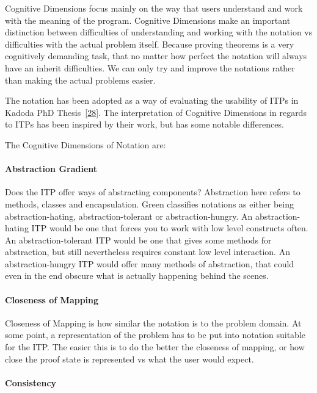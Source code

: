 \documentclass[
]{article}
\begin{document}
Cognitive Dimensions focus mainly on the way that users understand and
work with the meaning of the program. Cognitive Dimensions make an
important distinction between difficulties of understanding and working
with the notation vs difficulties with the actual problem itself.
Because proving theorems is a very cognitively demanding task, that no
matter how perfect the notation will always have an inherit
difficulties. We can only try and improve the notations rather than
making the actual problems easier.

The notation has been adopted as a way of evaluating the usability of
ITPs in Kadoda PhD
Thesis~{[}\protect\hyperlink{ref-kadoda_desirable_1999}{28}{]}. The
interpretation of Cognitive Dimensions in regards to ITPs has been
inspired by their work, but has some notable differences.

The Cognitive Dimensions of Notation are:

\hypertarget{abstraction-gradient}{%
\paragraph{Abstraction Gradient}\label{abstraction-gradient}}

Does the ITP offer ways of abstracting components? Abstraction here
refers to methods, classes and encapsulation. Green classifies notations
as either being abstraction-hating, abstraction-tolerant or
abstraction-hungry. An abstraction-hating ITP would be one that forces
you to work with low level constructs often. An abstraction-tolerant ITP
would be one that gives some methods for abstraction, but still
nevertheless requires constant low level interaction. An
abstraction-hungry ITP would offer many methods of abstraction, that
could even in the end obscure what is actually happening behind the
scenes.

\hypertarget{closeness-of-mapping}{%
\paragraph{Closeness of Mapping}\label{closeness-of-mapping}}

Closeness of Mapping is how similar the notation is to the problem
domain. At some point, a representation of the problem has to be put
into notation suitable for the ITP. The easier this is to do the better
the closeness of mapping, or how close the proof state is represented vs
what the user would expect.

\hypertarget{consistency}{%
\paragraph{Consistency}\label{consistency}}
\end{document}
